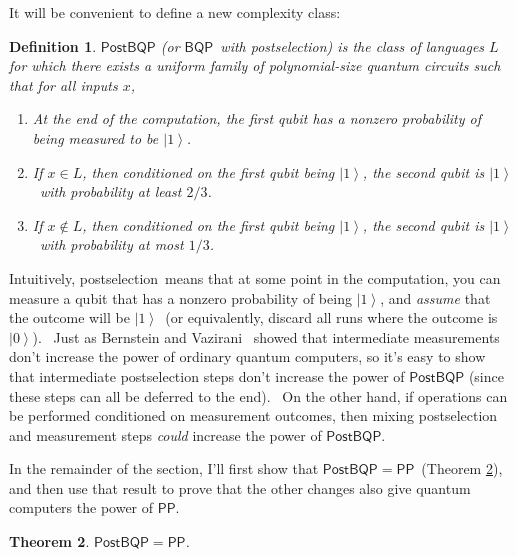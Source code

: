 \documentclass{article}%
\newtheorem{theorem}{Theorem}
\newtheorem{definition}[theorem]{Definition}
\begin{document}
It will be convenient to define a new complexity class:

\begin{definition}
\label{postbqpdef}$\mathsf{PostBQP}$ (or $\mathsf{BQP}$\ with postselection)
is the class of languages $L$ for which there exists a uniform family of
polynomial-size quantum circuits such that for all inputs $x$,

\begin{enumerate}
\item[(i)] At the end of the computation, the first qubit has a nonzero
probability of being measured to be $\left\vert 1\right\rangle $.

\item[(ii)] If $x\in L$, then conditioned on the first qubit being $\left\vert
1\right\rangle $, the second qubit is $\left\vert 1\right\rangle $\ with
probability at least $2/3$.

\item[(iii)] If $x\notin L$, then conditioned on the first qubit being
$\left\vert 1\right\rangle $, the second qubit is $\left\vert 1\right\rangle
$\ with probability at most $1/3$.
\end{enumerate}
\end{definition}

Intuitively, postselection\ means that at some point in the computation, you
can measure a qubit that has a nonzero probability of being $\left\vert
1\right\rangle $, and \textit{assume} that the outcome will be $\left\vert
1\right\rangle $\ (or equivalently, discard all runs where the outcome is
$\left\vert 0\right\rangle $). \ Just as Bernstein and Vazirani \cite{bv}%
\ showed that intermediate measurements don't increase the power of ordinary
quantum computers, so it's easy to show that intermediate postselection steps
don't increase the power of $\mathsf{PostBQP}$ (since these steps can all be
deferred to the end). \ On the other hand, if operations can be performed
conditioned on measurement outcomes, then mixing postselection and measurement
steps \textit{could} increase the power of $\mathsf{PostBQP}$.

In the remainder of the section, I'll first show that $\mathsf{PostBQP}%
=\mathsf{PP}$\ (Theorem \ref{postbqppp}), and then use that result to prove
that the other changes also give quantum computers the power of $\mathsf{PP}$.

\begin{theorem}
\label{postbqppp}$\mathsf{PostBQP}=\mathsf{PP}$.
\end{theorem}
\end{document}
